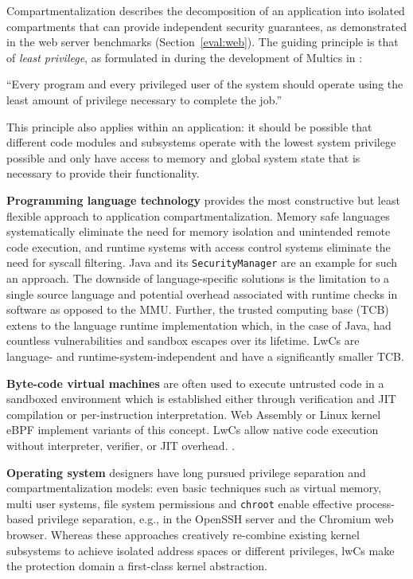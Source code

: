 \documentclass[10pt,twocolumn,a4paper]{article}
\begin{document}
Compartmentalization describes the decomposition of an application into isolated compartments that can provide independent security guarantees, as demonstrated in the web server benchmarks (Section~\ref{eval:web}).
The guiding principle is that of \textit{least privilege}, as formulated in during the development of Multics in \citeyear{principleofleastprivilege}:%
\begin{displayquote}
\enquote{Every program and every privileged user of the system should operate using the least amount of privilege necessary to complete the job.}
\cite{principleofleastprivilege}
\end{displayquote}
This principle also applies within an application: it should be possible that different code modules and subsystems operate with the lowest system privilege possible and only have access to memory and global system state that is necessary to provide their functionality.

\textbf{Programming language technology} provides the most constructive but least flexible approach to application compartmentalization.
Memory safe languages systematically eliminate the need for memory isolation and unintended remote code execution, and runtime systems with access control systems eliminate the need for syscall filtering.
Java and its \lstinline{SecurityManager} are an example for such an approach.
The downside of language-specific solutions is the limitation to a single source language and potential overhead associated with runtime checks in software as opposed to the MMU.
Further, the trusted computing base (TCB) extens to the language runtime implementation which, in the case of Java, had countless vulnerabilities and sandbox escapes over its lifetime.
LwCs are language- and runtime-system-independent and have a significantly smaller TCB.
\cite{javasecurity,bartel2018twentyyearsjavasecuritysandboxescape}

\textbf{Byte-code virtual machines} are often used to execute untrusted code in a sandboxed environment
which is established either through verification and JIT compilation or per-instruction interpretation.
Web Assembly or Linux kernel eBPF implement variants of this concept.
LwCs allow native code execution without interpreter, verifier, or JIT overhead.
\cite{haas2017bringingwebassembly, lwnebpf}.

\textbf{Operating system} designers have long pursued privilege separation and compartmentalization models:
even basic techniques such as virtual memory, multi user systems, file system permissions and \lstinline{chroot} enable effective process-based privilege separation, e.g., in the OpenSSH server and the Chromium web browser.
Whereas these approaches creatively re-combine existing kernel subsystems to achieve isolated address spaces or different privileges, lwCs make the protection domain a first-class kernel abstraction.
\cite{provos2003preventing, barth2008security}
\end{document}
